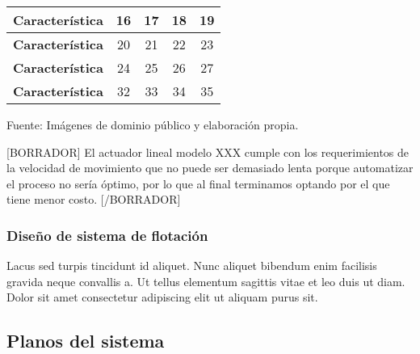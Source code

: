 \begin{mytable}[H]
\begin{tabular}{l|c|c|c|c|}
		\multicolumn{1}{|l|}{
			\begin{minipage}{\myforthmaxsizeofcontenttable}			
				\textbf{Característica}
			\end{minipage}
		}
		&
		16
		& 17         & 18         & 19         \\ \hline
		\multicolumn{1}{|l|}{
			\begin{minipage}{\myforthmaxsizeofcontenttable}			
				\textbf{Característica}
			\end{minipage}
		} & 20                                                                    & 21         & 22         & 23         \\ \hline
		\multicolumn{1}{|l|}{\textbf{Característica}}              & 24                                                                    & 25         & 26         & 27         \\ \hline
		\multicolumn{1}{|l|}{\textbf{Característica}}           & 32                                                                    & 33         & 34         & 35         \\ \hline
	\end{tabular}
	\begin{flushleft}	
		Fuente: Imágenes de dominio público y elaboración propia.
	\end{flushleft}
\end{mytable}

[BORRADOR] El actuador lineal modelo XXX cumple con los requerimientos de la velocidad de movimiento que no puede ser demasiado lenta porque automatizar el proceso no sería óptimo, por lo que al final terminamos optando por el que tiene menor costo. [/BORRADOR]

\subsubsection{Diseño de sistema de flotación}

Lacus sed turpis tincidunt id aliquet. Nunc aliquet bibendum enim facilisis gravida neque convallis a. Ut tellus elementum sagittis vitae et leo duis ut diam. Dolor sit amet consectetur adipiscing elit ut aliquam purus sit. 



\subsection{Planos del sistema}
\label{ssec:planos del sistema}

